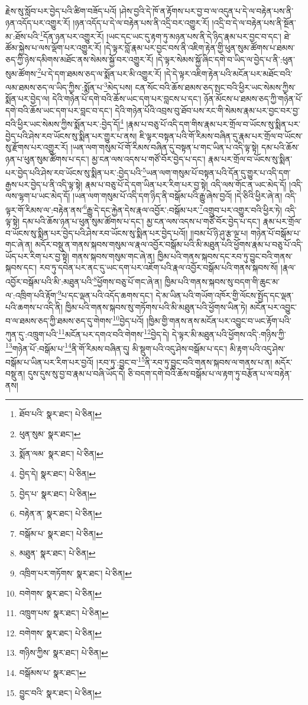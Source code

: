 རྗེས་སུ་སློབ་པར་བྱེད་པའི་ཚིག་བཟོད་པའོ། །ཤེས་བྱའི་དེ་ཁོ་ན་རྟོགས་པར་བྱ་བ་ལ་འདུན་པ་དེ་ལ་བརྟེན་པས་ནི་ཉན་འདོད་པར་འགྱུར་རོ། །ཉན་འདོད་པ་དེ་ལ་བརྟེན་པས་ནི་འདྲི་བར་འགྱུར་རོ། །འདྲི་བ་དེ་ལ་བརྟེན་པས་ནི་སྔོན་མ་:ཐོས་པའི་\footnote{ཐོབ་པའི་  སྣར་ཐང་།  པེ་ཅིན། }དོན་ཉན་པར་འགྱུར་རོ། །ཡང་དང་ཡང་དུ་རྟག་ཏུ་མཉན་པས་ནི་དེ་ཉིད་རྣམ་པར་བྱང་བ་དང་། ཐེ་ཚོམ་སྐྱེས་པ་ལས་ལྡོག་པར་འགྱུར་རོ། །དེ་ལྟར་བློ་རྣམ་པར་བྱང་བས་ནི་འཇིག་རྟེན་གྱི་ཕུན་སུམ་ཚོགས་པ་ཐམས་ཅད་ཀྱི་ཉེས་དམིགས་མཐོང་ནས་སེམས་སྐྱོ་བར་འགྱུར་རོ། །དེ་ལྟར་སེམས་སྐྱོ་ཞིང་དགེ་བ་ཡིད་ལ་བྱེད་པ་ནི་:ཕུན་སུམ་ཚོགས་\footnote{ཕུན་སུམ་  སྣར་ཐང་། }པ་དེ་དག་ཐམས་ཅད་ལ་སྨོན་པར་མི་འགྱུར་རོ། །དེ་དེ་ལྟར་འཇིག་རྟེན་པའི་མངོན་པར་མཐོང་བའི་ལམ་ཐམས་ཅད་ལ་ཡིད་ཀྱིས་:སྨོན་པ་\footnote{སྨོན་ལམ་  སྣར་ཐང་།  པེ་ཅིན། }མེད་པས། ངན་སོང་བའི་ཆོས་ཐམས་ཅད་སྤང་བའི་ཕྱིར་ཡང་སེམས་ཀྱིས་སྨོན་པར་བྱེད་ལ། དེའི་གཉེན་པོ་དགེ་བའི་ཆོས་ཡང་དག་པར་བླངས་པ་དང་། ཉོན་མོངས་པ་ཐམས་ཅད་ཀྱི་གཉེན་པོ་དགེ་བའི་ཆོས་ཡང་དག་པར་བླང་བ་དང་། དེའི་གཉེན་པོའི་འབྲས་བུ་ཐོབ་པས་རང་གི་སེམས་རྣམ་པར་བྱང་བར་བྱ་བའི་ཕྱིར་ཡང་སེམས་ཀྱིས་སྨོན་པར་:བྱེད་དོ།\footnote{བྱེད་དེ།  སྣར་ཐང་།  པེ་ཅིན། } །རྣམ་པ་བཅུ་པོ་འདི་དག་གིས་རྣམ་པར་གྲོལ་བ་ཡོངས་སུ་སྨིན་པར་བྱེད་པའི་ཤེས་རབ་ཡོངས་སུ་སྨིན་པར་གྱུར་པ་ནས། ཇི་ལྟར་བསྟན་པའི་གོ་རིམས་བཞིན་དུ་རྣམ་པར་གྲོལ་བ་ཡོངས་སུ་རྫོགས་པར་འགྱུར་རོ། །ཡན་ལག་གསུམ་པོ་གོ་རིམས་བཞིན་དུ་བསྟན་པ་གང་ཡིན་པ་འདི་ལྟ་སྟེ། དམ་པའི་ཆོས་ཉན་པ་ཕུན་སུམ་ཚོགས་པ་དང་། མྱ་ངན་ལས་འདས་པ་གཙོ་བོར་བྱེད་པ་དང་། རྣམ་པར་གྲོལ་བ་ཡོངས་སུ་སྨིན་པར་བྱེད་པའི་ཤེས་རབ་ཡོངས་སུ་སྨིན་པར་:བྱེད་པའི་\footnote{བྱེད་པ་  སྣར་ཐང་།  པེ་ཅིན། }ཡན་ལག་གསུམ་པོ་བསྟན་པའི་དོན་དུ་གྱུར་པ་འདི་དག་རྒྱས་པར་བྱེད་པ་ནི་འདི་ལྟ་སྟེ། རྣམ་པ་བཅུ་པོ་དེ་དག་ཡིན་པར་རིག་པར་བྱ་སྟེ། འདི་ལས་གོང་ན་ཡང་མེད་དོ། །འདི་ལས་ལྷག་པ་ཡང་མེད་དོ། །ཡན་ལག་གསུམ་པོ་འདི་དག་ཉིད་ནི་བསྒོམ་པའི་རྒྱུ་ཞེས་བྱའོ། །དེ་ཅིའི་ཕྱིར་ཞེ་ན། འདི་ལྟར་གོ་རིམས་ལ་:བརྟེན་ནས་\footnote{བརྟེན་ན་  སྣར་ཐང་།  པེ་ཅིན། }རྒྱུ་དེ་དང་རྐྱེན་དེས་རྣལ་འབྱོར་:བསྒོམ་པར་\footnote{བསྒོམ་པ་  སྣར་ཐང་།  པེ་ཅིན། }འགྲུབ་པར་འགྱུར་བའི་ཕྱིར་ཏེ། འདི་ལྟ་སྟེ། དམ་པའི་ཆོས་ཉན་པ་ཕུན་སུམ་ཚོགས་པ་དང་། མྱ་ངན་ལས་འདས་པ་གཙོ་བོར་བྱེད་པ་དང་། རྣམ་པར་གྲོལ་བ་ཡོངས་སུ་སྨིན་པར་བྱེད་པའི་ཤེས་རབ་ཡོངས་སུ་སྨིན་པར་བྱེད་པའོ།། །།བམ་པོ་ཉི་ཤུ་རྩ་ལྔ་པ། གཉེན་པོ་བསྒོམ་པ་གང་ཞེ་ན། མདོར་བསྡུ་ན་གནས་སྐབས་གསུམ་ལ་རྣལ་འབྱོར་བསྒོམ་པའི་མི་མཐུན་པའི་ཕྱོགས་རྣམ་པ་བཅུ་པོ་འདི་ཡོད་པར་རིག་པར་བྱ་སྟེ། གནས་སྐབས་གསུམ་གང་ཞེ་ན། ཁྱིམ་པའི་གནས་སྐབས་དང་རབ་ཏུ་བྱུང་བའི་གནས་སྐབས་དང་། རབ་ཏུ་དབེན་པར་ནང་དུ་ཡང་དག་པར་འཇོག་པའི་རྣལ་འབྱོར་བསྒོམ་པའི་གནས་སྐབས་སོ། །རྣལ་འབྱོར་བསྒོམ་པའི་མི་:མཐུན་པའི་\footnote{མཐུན་  སྣར་ཐང་།  པེ་ཅིན། }ཕྱོགས་བཅུ་པོ་གང་ཞེ་ན། ཁྱིམ་པའི་གནས་སྐབས་སུ་བདག་གི་ཆུང་མ་ལ་:འཁྲིག་པའི་རྟོག་\footnote{འཁྲིག་པར་གཏོགས་  སྣར་ཐང་།  པེ་ཅིན། }པ་དང་ལྡན་པའི་འདོད་ཆགས་དང་། དེ་མ་ཡིན་པའི་གཡོག་འཁོར་གྱི་ལོངས་སྤྱོད་དང་ལྡན་པའི་ཆགས་པ་འདི་ནི། ཁྱིམ་པའི་གནས་སྐབས་སུ་གཏོགས་པའི་མི་མཐུན་པའི་ཕྱོགས་ཡིན་ཏེ། མངོན་པར་འབྱུང་བ་ལ་ཐམས་ཅད་ཀྱི་ཐམས་ཅད་དུ་གེགས་\footnote{བགེགས་  སྣར་ཐང་།  པེ་ཅིན། }བྱེད་པའོ། །ཁྱིམ་གྱི་གནས་ནས་མངོན་པར་འབྱུང་བ་ཡང་རྟོག་པའི་ཀུན་དུ་:འཁྲུག་པའི་\footnote{འཁྲུག་པས་  སྣར་ཐང་།  པེ་ཅིན། }མངོན་པར་དགའ་བའི་གེགས་\footnote{བགེགས་  སྣར་ཐང་།  པེ་ཅིན། }བྱེད་དེ། དེ་ལྟར་མི་མཐུན་པའི་ཕྱོགས་འདི་:གཉིས་ཀྱི་\footnote{གཉིས་ཀྱིས་  སྣར་ཐང་།  པེ་ཅིན། }གཉེན་པོ་:བསྒོམ་པ་\footnote{བསྒོམས་པ་  སྣར་ཐང་། }ནི་གོ་རིམས་བཞིན་དུ། མི་སྡུག་པའི་འདུ་ཤེས་བསྒོམ་པ་དང་། མི་རྟག་པའི་འདུ་ཤེས་བསྒོམ་པ་ཡིན་པར་རིག་པར་བྱའོ། །རབ་ཏུ་:བྱུང་བ་\footnote{བྱུང་བའི་  སྣར་ཐང་།  པེ་ཅིན། }ནི་རབ་ཏུ་བྱུང་བའི་གནས་སྐབས་ལ་གནས་པ་ན། མདོར་བསྡུ་ན། དུས་དུས་སུ་བྱ་བ་རྣམ་པ་བཞི་ཡོད་དེ། ཅི་བདག་དགེ་བའི་ཆོས་བསྒོམ་པ་ལ་རྟག་ཏུ་བརྩོན་པ་ལ་བརྟེན་ནས། 